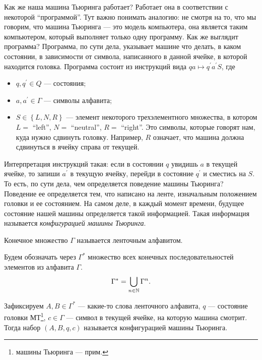 Как же наша машина Тьюринга работает?
Работает она в соответствии с некоторой \enquote{программой}.
Тут важно понимать аналогию: не смотря на то, что мы говорим, что машина Тьюринга --- это модель компьютера, она является таким компьютером, который выполняет только одну программу.
Как же выглядит программа?
Программа, по сути дела, указывает машине что делать, в каком состоянии, в зависимости от символа, написанного в данной ячейке, в которой находится головка.
Программа состоит из инструкций вида $q a \mapsto q^{\prime} a^{\prime} S$, где
\begin{itemize}
    \item $q, q^{\prime} \in Q$ --- состояния;
    \item $a, a^{\prime} \in \Gamma$ --- символы алфавита;
    \item $S \in \left\{L, N, R\right\}$ --- элемент некоторого трехэлементного множества, в котором $L = $ \enquote{left}, $N = $ \enquote{neutral}, $R = $ \enquote{right}.
    Это символы, которые говорят нам, куда нужно сдвинуть головку.
    Например, $R$ означает, что машина должна сдвинуться в ячейку справа от текущей.
\end{itemize}
Интерпретация инструкций такая: если в состоянии $q$ увидишь $a$ в текущей ячейке, то запиши $a^{\prime}$ в текущую ячейку, перейди в состояние $q^{\prime}$ и сместись на $S$.
То есть, по сути дела, чем определяется поведение машины Тьюринга?
Поведение ее определяется тем, что написано на ленте, изначальным положением головки и ее состоянием.
На самом деле, в каждый момент времени, будущее состояние нашей машины определяется такой информацией.
Такая информация называется {\it конфигурацией машины Тьюринга}.

\begin{definition}
    Конечное множество $\Gamma$ называется ленточным алфавитом.
\end{definition}

\begin{definition}
    Будем обозначать через $\Gamma^{*}$ множество всех конечных последовательностей элементов из алфавита $\Gamma$.
    $$
        \Gamma^{*} = \bigcup\limits_{n \in \mathbb{N}} \Gamma^{n}.
    $$
\end{definition}

\begin{definition}
    Зафиксируем $A, B \in \Gamma^{*}$ --- какие-то слова ленточного алфавита, $q$ --- состояние головки МТ\footnote{машины Тьюринга --- прим.}, $c \in \Gamma$ --- символ в текущей ячейке, на которую машина смотрит.
    Тогда набор $\left(A, B, q, c\right)$ называется конфигурацией машины Тьюринга.
\end{definition}

